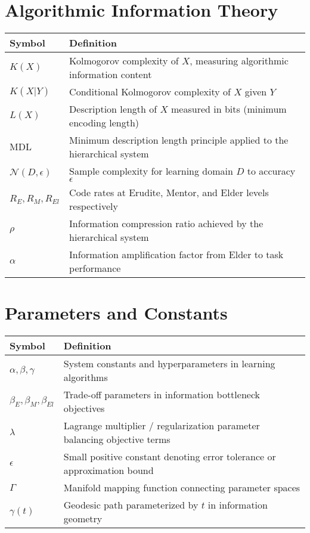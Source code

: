 \section*{Algorithmic Information Theory}
\begin{center}
\begin{tabular}{>{\centering\arraybackslash}p{3cm} p{10cm}}
\hline
\textbf{Symbol} & \textbf{Definition} \\
\hline
$K(X)$ & Kolmogorov complexity of $X$, measuring algorithmic information content \\
$K(X|Y)$ & Conditional Kolmogorov complexity of $X$ given $Y$ \\
$L(X)$ & Description length of $X$ measured in bits (minimum encoding length) \\
$\text{MDL}$ & Minimum description length principle applied to the hierarchical system \\
$\mathcal{N}(D, \epsilon)$ & Sample complexity for learning domain $D$ to accuracy $\epsilon$ \\
$R_E, R_M, R_{El}$ & Code rates at Erudite, Mentor, and Elder levels respectively \\
$\rho$ & Information compression ratio achieved by the hierarchical system \\
$\alpha$ & Information amplification factor from Elder to task performance \\
\hline
\end{tabular}
\end{center}

\vspace{0.5cm}

\section*{Parameters and Constants}
\begin{center}
\begin{tabular}{>{\centering\arraybackslash}p{3cm} p{10cm}}
\hline
\textbf{Symbol} & \textbf{Definition} \\
\hline
$\alpha, \beta, \gamma$ & System constants and hyperparameters in learning algorithms \\
$\beta_E, \beta_M, \beta_{El}$ & Trade-off parameters in information bottleneck objectives \\
$\lambda$ & Lagrange multiplier / regularization parameter balancing objective terms \\
$\epsilon$ & Small positive constant denoting error tolerance or approximation bound \\
$\Gamma$ & Manifold mapping function connecting parameter spaces \\
$\gamma(t)$ & Geodesic path parameterized by $t$ in information geometry \\
\hline
\end{tabular}
\end{center}

